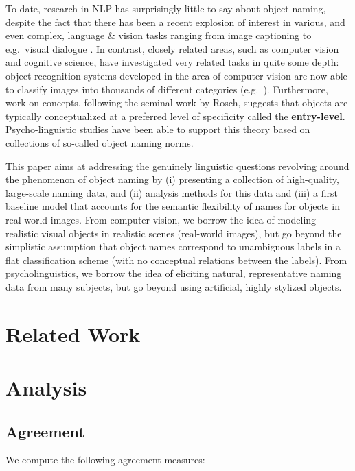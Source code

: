 \documentclass[11pt,a4paper]{article}
\begin{document}
To date, research in NLP has surprisingly little to say about object naming, despite the fact that
 there has been a recent explosion of interest in various, and even complex, language \& vision tasks ranging from image captioning \cite{fangetal:2015,devlin:imcaqui,Bernardietal:automatic} to e.g.\ visual dialogue \cite{das2017visual,vries2017guesswhat}. 
In contrast, closely related areas, such as computer vision and cognitive science, have investigated very related tasks in quite some depth: object recognition systems developed in the area of computer vision  are now able to classify images into thousands of different categories (e.g.\  ).
Furthermore, work on concepts, following the seminal work by Rosch, suggests that objects are typically conceptualized at a preferred level of specificity called the \textbf{entry-level}. Psycho-linguistic studies have been able to support this theory based on collections of so-called object naming norms. 

This paper aims at addressing the genuinely linguistic questions revolving around the phenomenon of object naming by (i) presenting a collection of high-quality, large-scale naming data,  and (ii) analysis methods for this data and (iii) a first baseline model that accounts for the semantic flexibility of names for objects in real-world images. From computer vision, we borrow the idea of modeling realistic visual objects in realistic scenes (real-world images), but go beyond the simplistic assumption that object names correspond to unambiguous labels in a flat classification scheme (with no conceptual relations between the labels). From psycholinguistics, we borrow the idea of eliciting natural, representative naming data from many subjects, but go beyond using artificial, highly stylized objects.

\section{Related Work}

\section{Analysis}

\subsection{Agreement}

We compute the following agreement measures:
\end{document}
